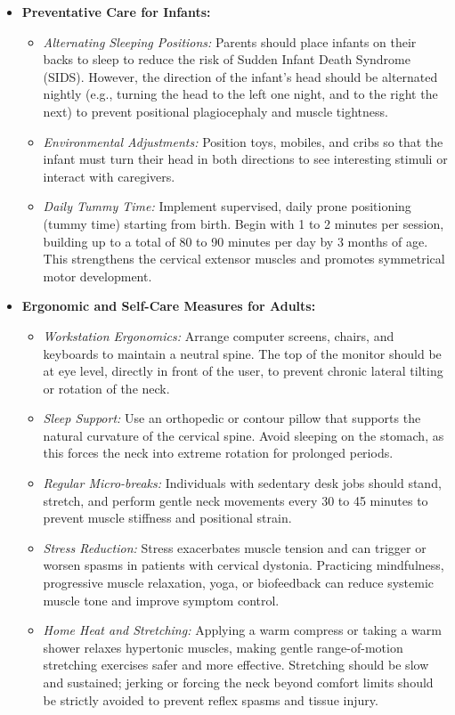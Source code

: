 \begin{itemize}
    \item \textbf{Preventative Care for Infants:}
    \begin{itemize}
        \item \textit{Alternating Sleeping Positions:} Parents should place infants on their backs to sleep to reduce the risk of Sudden Infant Death Syndrome (SIDS). However, the direction of the infant's head should be alternated nightly (e.g., turning the head to the left one night, and to the right the next) to prevent positional plagiocephaly and muscle tightness.
        \item \textit{Environmental Adjustments:} Position toys, mobiles, and cribs so that the infant must turn their head in both directions to see interesting stimuli or interact with caregivers.
        \item \textit{Daily Tummy Time:} Implement supervised, daily prone positioning (tummy time) starting from birth. Begin with 1 to 2 minutes per session, building up to a total of 80 to 90 minutes per day by 3 months of age. This strengthens the cervical extensor muscles and promotes symmetrical motor development.
    \end{itemize}
    \item \textbf{Ergonomic and Self-Care Measures for Adults:}
    \begin{itemize}
        \item \textit{Workstation Ergonomics:} Arrange computer screens, chairs, and keyboards to maintain a neutral spine. The top of the monitor should be at eye level, directly in front of the user, to prevent chronic lateral tilting or rotation of the neck.
        \item \textit{Sleep Support:} Use an orthopedic or contour pillow that supports the natural curvature of the cervical spine. Avoid sleeping on the stomach, as this forces the neck into extreme rotation for prolonged periods.
        \item \textit{Regular Micro-breaks:} Individuals with sedentary desk jobs should stand, stretch, and perform gentle neck movements every 30 to 45 minutes to prevent muscle stiffness and positional strain.
        \item \textit{Stress Reduction:} Stress exacerbates muscle tension and can trigger or worsen spasms in patients with cervical dystonia. Practicing mindfulness, progressive muscle relaxation, yoga, or biofeedback can reduce systemic muscle tone and improve symptom control.
        \item \textit{Home Heat and Stretching:} Applying a warm compress or taking a warm shower relaxes hypertonic muscles, making gentle range-of-motion stretching exercises safer and more effective. Stretching should be slow and sustained; jerking or forcing the neck beyond comfort limits should be strictly avoided to prevent reflex spasms and tissue injury.
    \end{itemize}
\end{itemize}

